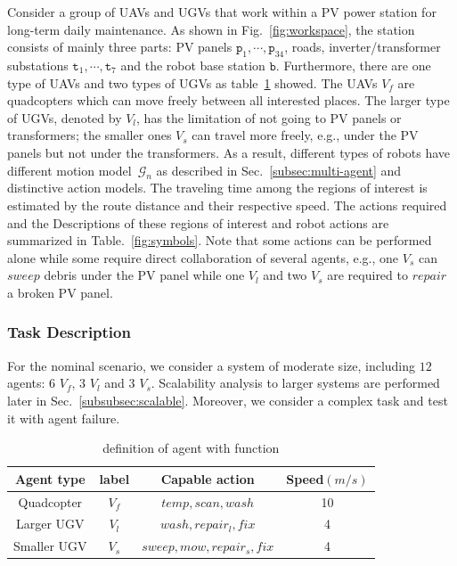 Consider a group of UAVs and UGVs that work within a PV power station for
long-term daily maintenance.
As shown in Fig.~\ref{fig:workspace},
the station consists of mainly three parts: PV panels $\texttt{p}_1,\cdots,\texttt{p}_{34}$, roads,
inverter/transformer substations $\texttt{t}_1,\cdots,\texttt{t}_7$ and the robot base station $\texttt{b}$. 
Furthermore, there are one type of UAVs and two types of UGVs as table~\ref{table:agent} showed.
The UAVs $V_f$ are quadcopters which can move freely between all interested places.
The larger type of UGVs, denoted by $V_l$, has the limitation of not going to PV panels or transformers;
the smaller ones $V_s$ can travel more freely, e.g., under the PV panels but not under the transformers. 
As a result, different types of robots have different motion 
model~$\mathcal{G}_n$ as described in Sec.~\ref{subsec:multi-agent}
and distinctive action models.
The traveling time among the regions of interest is estimated by the route
distance and their respective speed. The actions required and the  
Descriptions of these regions of interest and robot actions are summarized in
Table.~\ref{fig:symbols}.
Note that some actions can be performed alone while some require direct
collaboration of several agents,
e.g., one $V_s$ can $sweep$ debris under the PV panel while one $V_l$
and two $V_s$ are required to $repair$ a broken PV panel.


\subsubsection{Task Description}\label{subsubsec:task}

For the nominal scenario, we consider a system of moderate size,
including $12$ agents: 6 $V_f$, 3 $V_l$ and 3 $V_s$.
Scalability analysis to larger systems are performed later in Sec.~\ref{subsubsec:scalable}.
Moreover, we consider a complex task and test it with agent failure.

\begin{table}[t]\footnotesize
\caption{definition of agent with function}
\label{table:agent}
\begin{tabular}{|c|c|c|c|}\hline
	\textbf{Agent type} &\textbf{label} & \textbf{Capable action} & \textbf{Speed}$(m/ s )$\\ \hline
	 Quadcopter& $V_f$  & $temp, scan, wash $ & 10 \\ \hline
	 Larger UGV& $V_l$  & $wash,repair_l,fix$ & 4 \\ \hline
	 Smaller UGV& $V_s$  &  $sweep, mow, repair_s, fix$ & 4 \\ \hline
\end{tabular}
\end{table}


